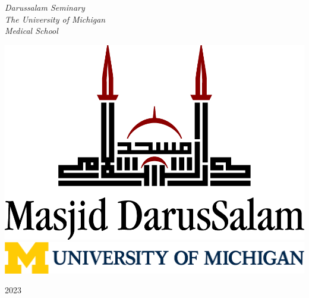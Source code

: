 \documentclass[11pt,twoside]{book}
\begin{document}
\begin{titlepage}
	\vspace{0.5\baselineskip} %
	
	\textit{\textenglish{Darussalam Seminary\\\vspace{3mm}The University of Michigan\\Medical School}} %
	
	\vfill %
	
	
    \includegraphics[scale=0.4]{MasjidLogo}\\
    \includegraphics[scale=0.4]{UMLogo}
	
	\vspace{0.3\baselineskip} %
	
	\textenglish{2023} %
	

\end{titlepage}
\end{document}
